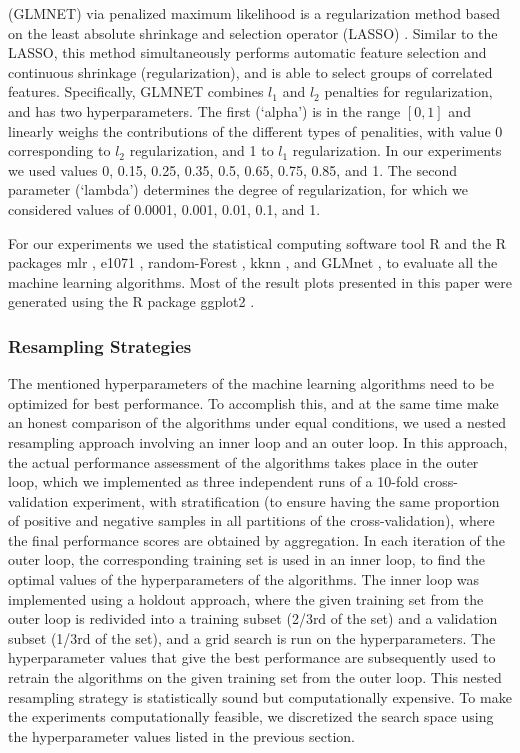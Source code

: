 {\color{red}{\bf Generalized Linear Model} (GLMNET) via penalized maximum likelihood \citep{glmnet}} is a regularization method based on the least absolute shrinkage and selection operator (LASSO) \citep{Tibshirani96regressionshrinkage}. Similar to the LASSO, this method simultaneously performs automatic feature selection and continuous shrinkage (regularization), and is able to select groups of correlated features. Specifically, {\color{red} GLMNET combines $l_1$ and $l_2$ penalties for regularization, and has two hyperparameters.} The first (`alpha') is in the range $[0,1]$ and linearly weighs the contributions of the different types of penalities, with value 0 corresponding to $l_2$ regularization, and 1 to $l_1$ regularization. In our experiments we used values 0, 0.15, 0.25, 0.35, 0.5, 0.65, 0.75, 0.85, and 1. The second parameter (`lambda') determines the degree of regularization, for which we considered values of 0.0001, 0.001, 0.01, 0.1, and 1.

\bigskip

For our experiments we used the statistical computing software tool R \citep{Rpackage2016} and the R packages mlr \citep{mlrpackage2016}, e1071 \citep{e1071}, random-Forest \citep{randomForest}, kknn \citep{kknn}, and GLMnet \citep{glmnet}, to evaluate all the machine learning algorithms. Most of the result plots presented in this paper were generated using the R package ggplot2 \citep{Wickham-2009}.

\subsubsection{Resampling Strategies}
\label{subsubsec:resampling}

The mentioned hyperparameters of the machine learning algorithms need to be optimized for best performance. To accomplish this, and at the same time make an honest comparison of the algorithms under equal conditions, we used a nested resampling approach \citep{Simon2007, Bischl:2012:RMM:2261317.2261322} involving an inner loop and an outer loop. In this approach, the actual performance assessment of the algorithms takes place in the outer loop, which we implemented as three independent runs of a 10-fold cross-validation experiment, with stratification (to ensure having the same proportion of positive and negative samples in all partitions of the cross-validation), where the final performance scores are obtained by aggregation. In each iteration of the outer loop, the corresponding training set is used in an inner loop, to find the optimal values of the hyperparameters of the algorithms. The inner loop was implemented using a holdout approach, where the given training set from the outer loop is redivided into a training subset (2/3rd of the set) and a validation subset (1/3rd of the set), and a grid search is run on the hyperparameters. The hyperparameter values that give the best performance are subsequently used to retrain the algorithms on the given training set from the outer loop. This nested resampling strategy is statistically sound but computationally expensive. To make the experiments computationally feasible, we discretized the search space using the hyperparameter values listed in the previous section.

